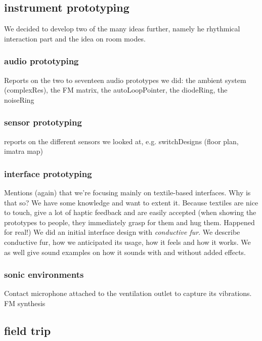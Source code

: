 \documentclass{chi-ext}
\begin{document}
\begin{multicols}{2}
\subsection{instrument prototyping}
\label{sub:instrument_prototyping}

We decided to develop two of the many ideas further, namely he rhythmical interaction part and the idea on room modes.

\subsubsection{audio prototyping}
\label{ssub:audio_prototyping}

Reports on the two to seventeen audio prototypes we did: 
the ambient system (complexRes), the FM matrix, the autoLoopPointer, the diodeRing, the noiseRing

\subsubsection{sensor prototyping}
\label{sub:sensor_prototyping}
reports on the different sensors we looked at, e.g. switchDesigns (floor plan, imatra map)


\subsubsection{interface prototyping}
\label{ssub:interface_prototyping}

Mentions (again) that we're focusing mainly on textile-based interfaces.
Why is that so? 
	We have some knowledge and want to extent it. 
	Because textiles are nice to touch, give a lot of haptic feedback and are easily accepted (when showing the prototypes to people, they immediately grasp for them and hug them. Happened for real!)
We did an initial interface design with \emph{conductive fur}. 
We describe conductive fur, how we anticipated its usage, how it feels and how it works.
We as well give sound examples on how it sounds with and without added effects.

\subsubsection{sonic environments}
\label{ssub:sonic_environments}

Contact microphone attached to the ventilation outlet to capture its vibrations.
FM synthesis

\subsection{field trip}
\label{sub:field_trip}


\end{multicols}
\end{document}
